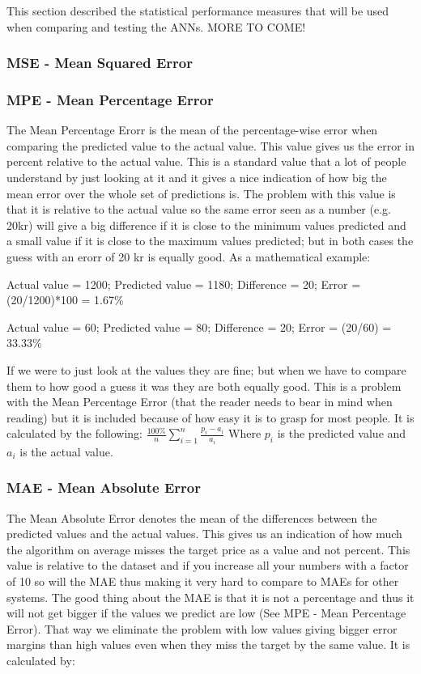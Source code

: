 This section described the statistical performance measures that will be used when comparing and testing the ANNs. MORE TO COME!

\subsubsection{MSE - Mean Squared Error}

\subsubsection{MPE - Mean Percentage Error}
The Mean Percentage Erorr is the mean of the percentage-wise error when comparing the predicted value to the actual value. This value gives us the error in percent relative to the actual value. This is a standard value that a lot of people understand by just looking at it and it gives a nice indication of how big the mean error over the whole set of predictions is. The problem with this value is that it is relative to the actual value so the same error seen as a number (e.g. 20kr) will give a big difference if it is close to the minimum values predicted and a small value if it is close to the maximum values predicted; but in both cases the guess with an erorr of 20 kr is equally good. As a mathematical example:

Actual value = 1200; Predicted value = 1180; Difference = 20; Error = (20/1200)*100 = 1.67\% 

Actual value = 60; Predicted value = 80; Difference = 20; Error = (20/60) = 33.33\%

If we were to just look at the values they are fine; but when we have to compare them to how good a guess it was they are both equally good. This is a problem with the Mean Percentage Error (that the reader needs to bear in mind when reading) but it is included because of how easy it is to grasp for most people.
It is calculated by the following:
$ \frac{100\%}{n}\sum_{i=1}^{n}\frac{p_i - a_i}{a_i} $
Where $p_i$ is the predicted value and $a_i$ is the actual value.
\subsubsection{MAE - Mean Absolute Error}
The Mean Absolute Error denotes the mean of the differences between the predicted values and the actual values. This gives us an indication of how much the algorithm on average misses the target price as a value and not percent. This value is relative to the dataset and if you increase all your numbers with a factor of 10 so will the MAE thus making it very hard to compare to MAEs for other systems. The good thing about the MAE is that it is not a percentage and thus it will not get bigger if the values we predict are low (See MPE - Mean Percentage Error). That way we eliminate the problem with low values giving bigger error margins than high values even when they miss the target by the same value. It is calculated by:

